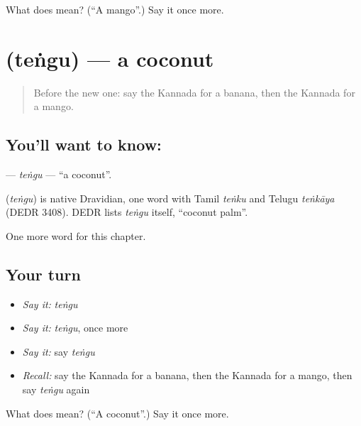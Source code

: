 \begin{tcolorbox}[breakable,colback=teal!4,colframe=teal!35!black,title={Before you move on}]
What does  mean? (\textquotedblleft{}A mango\textquotedblright{}.) Say it once more.
\end{tcolorbox}
\section[\texorpdfstring{\kn{ತೆಂಗು} (teṅgu)}{ತೆಂಗು (teṅgu)}]{ (teṅgu) — a coconut}

\label{lesson:KA-C123-tengu}



\begin{quote}
Before the new one: say the Kannada for a banana, then the Kannada for a mango.
\end{quote}

\subsection*{You'll want to know: }
\textbf{} — \emph{teṅgu} — \textquotedblleft{}a coconut\textquotedblright{}.

\begin{cousinweb}
\textbf{} (\emph{teṅgu}) is native Dravidian, one word with Tamil \emph{teṅku} and Telugu \emph{teṅkāya} (DEDR 3408). DEDR lists \emph{teṅgu} itself, \textquotedblleft{}coconut palm\textquotedblright{}.
\end{cousinweb}

\begin{grammarlens}[title={What you've built}]
One more word for this chapter.
\end{grammarlens}

\subsection*{Your turn}
\begin{itemize}
\raggedright
  \item \emph{Say it:} \emph{teṅgu}
  \item \emph{Say it:} \emph{teṅgu}, once more
  \item \emph{Say it:} say \emph{teṅgu}
  \item \emph{Recall:} say the Kannada for a banana, then the Kannada for a mango, then say \emph{teṅgu} again
\end{itemize}

\begin{tcolorbox}[breakable,colback=teal!4,colframe=teal!35!black,title={Before you move on}]
What does  mean? (\textquotedblleft{}A coconut\textquotedblright{}.) Say it once more.
\end{tcolorbox}
